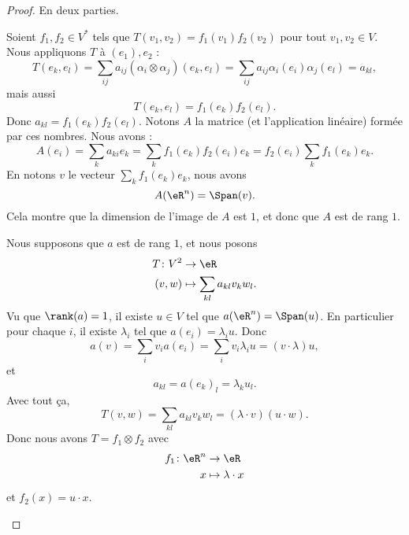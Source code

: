 \begin{proof}
	En deux parties.
	\begin{subproof}
		\spitem[\( \Rightarrow\)]
		Soient \( f_1, f_2\in V^*\) tels que \( T(v_1,v_2)=f_1(v_1)f_2(v_2)\) pour tout \( v_1,v_2\in V\). Nous appliquons \( T\) à \( (e_1), e_2\) :
		\begin{equation}
			T(e_k, e_l)=\sum_{ij}a_{ij}(\alpha_i\otimes \alpha_j)(e_k,e_l)=\sum_{ij}a_{ij}\alpha_i(e_i)\alpha_j(e_l)=a_{kl},
		\end{equation}
		mais aussi
		\begin{equation}
			T(e_k,e_l)=f_1(e_k)f_2(e_l).
		\end{equation}
		Donc \( a_{kl}=f_1(e_k)f_2(e_l)\). Notons \( A\) la matrice (et l'application linéaire) formée par ces nombres. Nous avons :
		\begin{equation}
			A(e_i)=\sum_ka_{ki}e_k=\sum_kf_1(e_k)f_2(e_i)e_k=f_2(e_i)\sum_kf_1(e_k)e_k.
		\end{equation}
		En notons \( v\) le vecteur \( \sum_kf_1(e_k)e_k\), nous avons
		\begin{equation}
			A(\eR^n)=\Span(v).
		\end{equation}
		Cela montre que la dimension de l'image de \( A\) est \( 1\), et donc que \( A\) est de rang \( 1\).

		\spitem[\( \Leftarrow\)]
		Nous supposons que \( a\) est de rang \( 1\), et nous posons
		\begin{equation}
			\begin{aligned}
				T\colon V^2 & \to \eR                        \\
				(v,w)       & \mapsto \sum_{kl}a_{kl}v_kw_l.
			\end{aligned}
		\end{equation}
		Vu que \( \rank(a)=1\), il existe \( u\in V\) tel que \( a(\eR^n)=\Span(u)\). En particulier pour chaque \( i\), il existe \( \lambda_i\) tel que \( a(e_i)=\lambda_i u\). Donc
		\begin{equation}
			a(v)=\sum_iv_ia(e_i)=\sum_iv_i\lambda_iu=(v\cdot \lambda)u,
		\end{equation}
		et
		\begin{equation}
			a_{kl}=a(e_k)_l=\lambda_ku_l.
		\end{equation}
		Avec tout ça,
		\begin{equation}
			T(v,w)=\sum_{kl}a_{kl}v_kw_l=(\lambda\cdot v)(u\cdot w).
		\end{equation}
		Donc nous avons \( T=f_1\otimes f_2\) avec
		\begin{equation}
			\begin{aligned}
				f_1\colon \eR^n & \to \eR                \\
				x               & \mapsto \lambda\cdot x
			\end{aligned}
		\end{equation}
		et \( f_2(x)=u\cdot x\).
	\end{subproof}
\end{proof}

